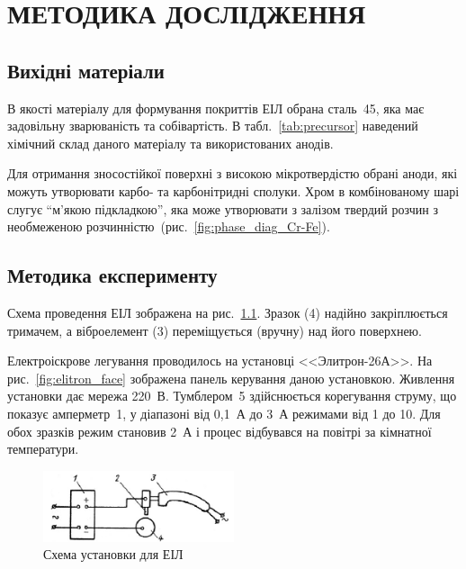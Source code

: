 \documentclass[a4paper,fontsize=14bp,ukrainian]{extreport}
\begin{document}
\chapter{МЕТОДИКА ДОСЛІДЖЕННЯ}

\section{Вихідні матеріали}

В якості матеріалу для формування покриттів ЕІЛ обрана сталь~45, яка має задовільну зварюваність та собівартість.
В табл.~\ref{tab:precursor} наведений хімічний склад даного матеріалу та використованих анодів.



Для отримання зносостійкої поверхні з високою мікротвердістю обрані аноди, які можуть утворювати карбо- та карбонітридні сполуки. Хром в комбінованому шарі слугує ``м’якою підкладкою'', яка може утворювати з залізом твердий розчин з необмеженою розчинністю~(рис.~\ref{fig:phase_diag_Cr-Fe}).

\section{Методика експерименту}

Схема проведення ЕІЛ зображена на рис.~\ref{fig:schema_device}. Зразок (4) надійно закріплюється тримачем, а віброелемент (3) переміщується (вручну) над його поверхнею.

Електроіскрове легування проводилось на установці <<Элитрон-26А>>. На рис.~\ref{fig:elitron_face} зображена панель керування даною установкою. Живлення установки дає мережа 220~В. Тумблером~5 здійснюється корегування струму, що показує амперметр~1, у діапазоні від 0,1~А до 3~А режимами від 1 до 10. Для обох зразків режим становив 2~А і процес відбувався на повітрі за кімнатної температури.


\begin{figure}[H]
\centering
\includegraphics[width=0.5\textwidth]{schema_device.png}
\caption{Схема установки для ЕІЛ~\cite{ivanov2016}}
\label{fig:schema_device}
\end{figure}
\end{document}
